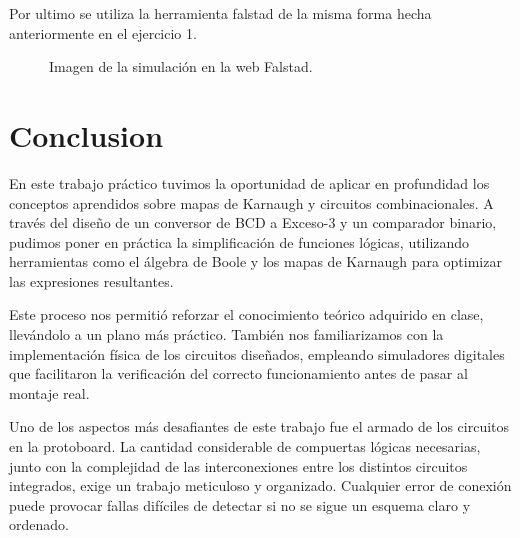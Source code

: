 \documentclass{informeutn}
\begin{document}
Por ultimo se utiliza la herramienta falstad de la misma forma hecha anteriormente en el ejercicio 1.

\begin{figure}[h]
  \centering
  \caption{Imagen de la simulación en la web Falstad.}
  \label{fig:enter-label}
\end{figure}

\chapter{Conclusion}

En este trabajo práctico tuvimos la oportunidad de aplicar en profundidad los conceptos aprendidos sobre mapas de Karnaugh y circuitos combinacionales. A través del diseño de un conversor de BCD a Exceso-3 y un comparador binario, pudimos poner en práctica la simplificación de funciones lógicas, utilizando herramientas como el álgebra de Boole y los mapas de Karnaugh para optimizar las expresiones resultantes.

Este proceso nos permitió reforzar el conocimiento teórico adquirido en clase, llevándolo a un plano más práctico. También nos familiarizamos con la implementación física de los circuitos diseñados, empleando simuladores digitales que facilitaron la verificación del correcto funcionamiento antes de pasar al montaje real.

Uno de los aspectos más desafiantes de este trabajo fue el armado de los circuitos en la protoboard. La cantidad considerable de compuertas lógicas necesarias, junto con la complejidad de las interconexiones entre los distintos circuitos integrados, exige un trabajo meticuloso y organizado. Cualquier error de conexión puede provocar fallas difíciles de detectar si no se sigue un esquema claro y ordenado.
\end{document}
